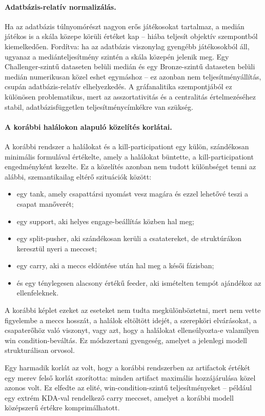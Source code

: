 ﻿\documentclass[a4paper,12pt]{report}
\begin{document}
\paragraph{Adatbázis-relatív normalizálás.}
Ha az adatbázis túlnyomórészt nagyon erős játékosokat tartalmaz, a medián játékos is a skála közepe körüli értéket kap -- hiába teljesít objektív szempontból kiemelkedően. Fordítva: ha az adatbázis viszonylag gyengébb játékosokból áll, ugyanaz a mediánteljesítmény szintén a skála közepén jelenik meg. Egy Challenger-szintű dataseten belüli medián és egy Bronze-szintű dataseten belüli medián numerikusan közel eshet egymáshoz -- ez azonban nem teljesítményállítás, csupán adatbázis-relatív elhelyezkedés. A gráfanalitika szempontjából ez különösen problematikus, mert az asszortativitás és a centralitás értelmezéséhez stabil, adatbázisfüggetlen teljesítménycímkékre van szükség.

\paragraph{A korábbi halálokon alapuló közelítés korlátai.}
A korábbi rendszer a halálokat és a kill-participationt egy külön, szándékosan minimális formulával értékelte, amely a halálokat büntette, a kill-participationt engedményként kezelte. Ez a közelítés azonban nem tudott különbséget tenni az alábbi, szemantikailag eltérő szituációk között:
\begin{itemize}
    \item egy tank, amely csapattársi nyomást vesz magára és ezzel lehetővé teszi a csapat manőverét;
    \item egy support, aki helyes engage-beállítás közben hal meg;
    \item egy split-pusher, aki szándékosan kerüli a csatatereket, de struktúrákon keresztül nyeri a meccset;
    \item egy carry, aki a meccs eldöntése után hal meg a késői fázisban;
    \item és egy ténylegesen alacsony értékű feeder, aki ismételten tempót ajándékoz az ellenfeleknek.
\end{itemize}
A korábbi képlet ezeket az eseteket nem tudta megkülönböztetni, mert nem vette figyelembe a meccs hosszát, a halálok eltöltött idejét, a szerepköri elvárásokat, a csapaterőhöz való viszonyt, vagy azt, hogy a halálokat ellensúlyozta-e valamilyen win condition-beváltás. Ez módszertani gyengeség, amelyet a jelenlegi modell strukturálisan orvosol.

Egy harmadik korlát az volt, hogy a korábbi rendszerben az artifactok értékét egy merev felső korlát szorította: minden artifact maximális hozzájárulása közel azonos volt. Ez elfedte az elité, win-condition-szintű teljesítményeket -- például egy extrém KDA-val rendelkező carry meccset, amelyet a korábbi modell középszerű értékre komprimálhatott.
\end{document}

